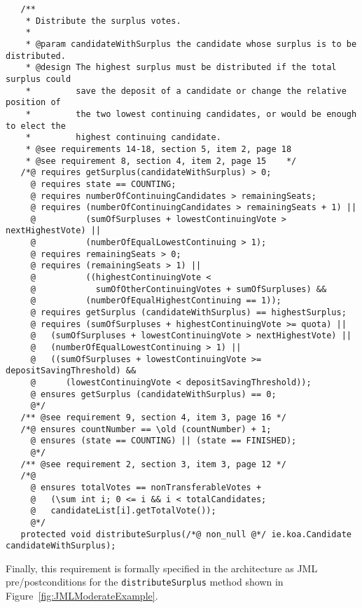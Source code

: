 \documentclass[letterpaper,twocolumn,10pt]{article}
\begin{document}
 \begin{figure*}[t]
 {\footnotesize
 \begin{verbatim}
   /** 
    * Distribute the surplus votes.
    * 
    * @param candidateWithSurplus the candidate whose surplus is to be distributed.
    * @design The highest surplus must be distributed if the total surplus could 
    *         save the deposit of a candidate or change the relative position of
    *         the two lowest continuing candidates, or would be enough to elect the
    *         highest continuing candidate.
    * @see requirements 14-18, section 5, item 2, page 18
    * @see requirement 8, section 4, item 2, page 15    */
   /*@ requires getSurplus(candidateWithSurplus) > 0;
     @ requires state == COUNTING;
     @ requires numberOfContinuingCandidates > remainingSeats;
     @ requires (numberOfContinuingCandidates > remainingSeats + 1) ||
     @          (sumOfSurpluses + lowestContinuingVote > nextHighestVote) ||
     @          (numberOfEqualLowestContinuing > 1);
     @ requires remainingSeats > 0;
     @ requires (remainingSeats > 1) ||
     @          ((highestContinuingVote < 
     @            sumOfOtherContinuingVotes + sumOfSurpluses) &&
     @          (numberOfEqualHighestContinuing == 1));
     @ requires getSurplus (candidateWithSurplus) == highestSurplus;
     @ requires (sumOfSurpluses + highestContinuingVote >= quota) ||
     @   (sumOfSurpluses + lowestContinuingVote > nextHighestVote) ||
     @   (numberOfEqualLowestContinuing > 1) ||
     @   ((sumOfSurpluses + lowestContinuingVote >= depositSavingThreshold) &&
     @      (lowestContinuingVote < depositSavingThreshold));
     @ ensures getSurplus (candidateWithSurplus) == 0;
     @*/
   /** @see requirement 9, section 4, item 3, page 16 */
   /*@ ensures countNumber == \old (countNumber) + 1;
     @ ensures (state == COUNTING) || (state == FINISHED);
     @*/
   /** @see requirement 2, section 3, item 3, page 12 */
   /*@
     @ ensures totalVotes == nonTransferableVotes + 
     @   (\sum int i; 0 <= i && i < totalCandidates; 
     @   candidateList[i].getTotalVote());
     @*/
   protected void distributeSurplus(/*@ non_null @*/ ie.koa.Candidate candidateWithSurplus);
 \end{verbatim}
 }
 \caption{JML Specification of the \texttt{distributeSurplus} method.}
 \label{fig:JMLModerateExample}
 \end{figure*}                           
 
 Finally, this requirement is formally specified in the
 architecture as JML pre/postconditions for the \texttt{distributeSurplus}
 method shown in Figure~\ref{fig:JMLModerateExample}.
 
\end{document}
